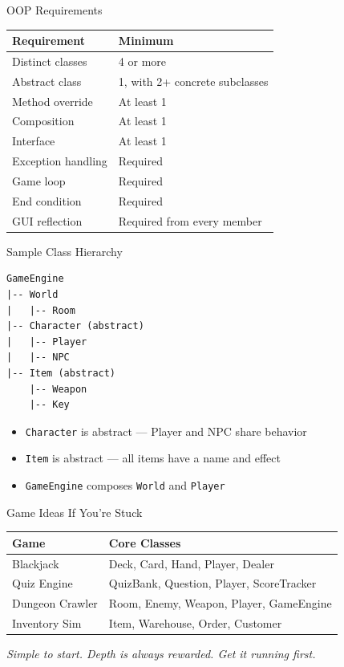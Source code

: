\documentclass{beamer}
\begin{document}
\begin{frame}{OOP Requirements}
\begin{tabular}{ll}
\toprule
\textbf{Requirement} & \textbf{Minimum} \\
\midrule
Distinct classes & 4 or more \\
Abstract class & 1, with 2+ concrete subclasses \\
Method override & At least 1 \\
Composition & At least 1 \\
Interface & At least 1 \\
Exception handling & Required \\
Game loop & Required \\
End condition & Required \\
GUI reflection & Required from every member \\
\bottomrule
\end{tabular}
\end{frame}
\begin{frame}[fragile]{Sample Class Hierarchy}
\begin{lstlisting}
GameEngine
|-- World
|   |-- Room
|-- Character (abstract)
|   |-- Player
|   |-- NPC
|-- Item (abstract)
    |-- Weapon
    |-- Key
\end{lstlisting}
\vspace{0.3cm}
\begin{itemize}
  \item \texttt{Character} is abstract --- Player and NPC share behavior
  \item \texttt{Item} is abstract --- all items have a name and effect
  \item \texttt{GameEngine} composes \texttt{World} and \texttt{Player}
\end{itemize}
\end{frame}
\begin{frame}{Game Ideas If You're Stuck}
\begin{tabular}{ll}
\toprule
\textbf{Game} & \textbf{Core Classes} \\
\midrule
Blackjack & Deck, Card, Hand, Player, Dealer \\
Quiz Engine & QuizBank, Question, Player, ScoreTracker \\
Dungeon Crawler & Room, Enemy, Weapon, Player, GameEngine \\
Inventory Sim & Item, Warehouse, Order, Customer \\
\bottomrule
\end{tabular}
\vspace{0.3cm}
\textit{Simple to start. Depth is always rewarded. Get it running first.}
\end{frame}
\end{document}
